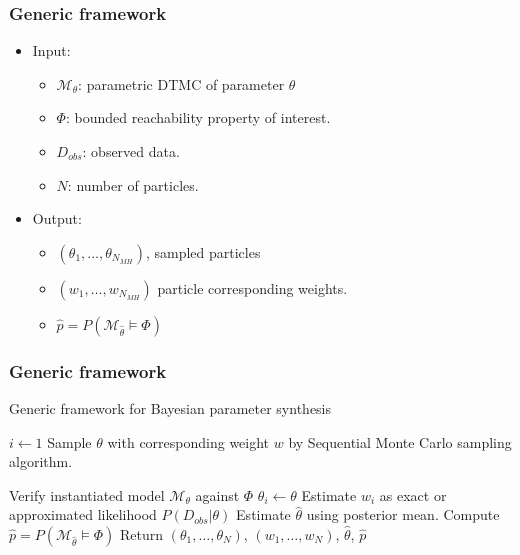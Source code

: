 \documentclass{beamer}
\makeatletter
\def\NoNumber#1{{\def\alglinenumber##1{}\State #1}\addtocounter{ALG@line}{-1}}
\makeatother
\begin{document}
\begin{frame}
    \frametitle{Generic framework}
    \begin{itemize}
        \item Input:
              \begin{itemize}
                  \item $\mathcal{M}_\theta$: parametric DTMC of parameter $\theta$
                  \item $\Phi$: bounded reachability property of interest.
                  \item $D_{obs}$: observed data.
                  \item $N$: number of particles.
              \end{itemize}
        \item Output:
              \begin{itemize}
                  \item $(\theta_1,\ldots,\theta_{N_{MH}})$, sampled particles
                  \item $(w_1,\ldots,w_{N_{MH}})$ particle corresponding weights.
                  \item $\hat{p}=P(\mathcal{M}_{\hat{\theta}}\models\Phi)$
              \end{itemize}
    \end{itemize}
\end{frame}

\begin{frame}
    \frametitle{Generic framework}
    \footnotesize{
        \begin{algorithm}[H]
            \caption{Generic framework for Bayesian parameter synthesis}
            \label{alg:generic-framework}
            \begin{algorithmic}[1]
                \State $i \leftarrow 1$
                \State Sample $\theta$ with corresponding weight $w$
                \NoNumber{\hspace{1.5cm} by Sequential Monte Carlo sampling algorithm.}
                \State Verify instantiated model $\mathcal{M}_\theta$ against $\Phi$
                \State $\theta_i \leftarrow \theta$
                \State Estimate $w_i$ as exact or approximated likelihood $P(D_{obs}|\theta)$
                \EndIf
                \EndWhile
                \State Estimate $\hat{\theta}$ using posterior mean.
                \State Compute $\hat{p}=P(\mathcal{M}_{\hat{\theta}}\models\Phi)$
                \State Return $(\theta_1,\ldots,\theta_{N})$, $(w_1,\ldots,w_{N})$, $\hat{\theta}$, $\hat{p}$
                \EndProcedure
            \end{algorithmic}
        \end{algorithm}
    }
\end{frame}
\end{document}
